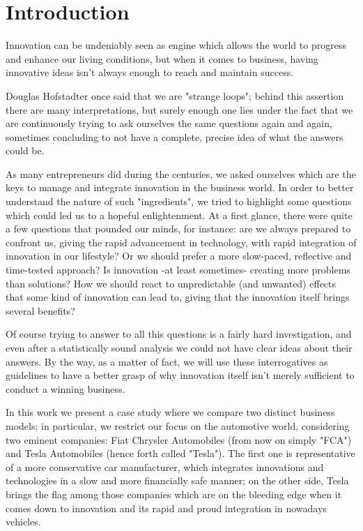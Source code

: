 \section{Introduction}

Innovation can be undeniably seen as engine which allows the world to progress and enhance our living conditions, but when it comes to business, having innovative ideas isn't always enough to reach and maintain success.

Douglas Hofstadter once said that we are "strange loops"; behind this assertion there are many interpretations, but surely enough one lies under the fact that we are continuously trying to ask ourselves the same questions again and again, sometimes concluding to not have a complete, precise idea of what the answers could be.

As many entrepreneurs did during the centuries, we asked ourselves which are the keys to manage and integrate innovation in the business world. In order to better understand the nature of such "ingredients", we tried to highlight some questions which could led us to a hopeful enlightenment. At a first glance, there were quite a few questions that pounded our minds, for instance: are we always prepared to confront us, giving the rapid advancement in technology, with rapid integration of innovation in our lifestyle? Or we should prefer a more slow-paced, reflective and time-tested approach? Is innovation -at least sometimes- creating more problems than solutions?
How we should react to unpredictable (and unwanted) effects that some kind of innovation can lead to, giving that the innovation itself brings several benefits?

Of course trying to answer to all this questions is a fairly hard investigation, and even after a statistically sound analysis we could not have clear ideas about their answers. By the way, as a matter of fact, we will use these interrogatives as guidelines to have a better grasp of why innovation itself isn't merely sufficient to conduct a winning business.

In this work we present a case study where we compare two distinct business models; in particular, we restrict our focus on the automotive world, considering two eminent companies: Fiat Chrysler Automobiles (from now on simply "FCA") and Tesla Automobiles (hence forth called "Tesla"). The first one is representative of a more conservative car manufacturer, which integrates innovations and technologies in a slow and more financially safe manner; on the other side, Tesla brings the flag among those companies which are on the bleeding edge when it comes down to innovation and its rapid and proud integration in nowadays vehicles.
